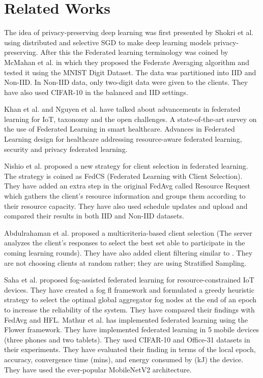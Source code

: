 \documentclass[conference]{IEEEtran}
\begin{document}
\section{Related Works}
The idea of privacy-preserving deep learning was first presented by Shokri et al. \cite{shokri2015privacy} using distributed and selective SGD to make deep learning models privacy-preserving. After this the Federated learning terminology was coined by McMahan et al. \cite{mcmahan2017communication} in which they proposed the Federate Averaging algorithm and tested it using the MNIST Digit Dataset. The data was partitioned into IID and Non-IID. In Non-IID data, only two-digit data were given to the clients. They have also used CIFAR-10 in the balanced and IID settings. 
 \par
Khan et al. \cite{khan2021federated} and Nguyen et al. \cite{nguyen2021federated} have talked about advancements in federated learning for IoT, taxonomy and the open challenges. A state-of-the-art survey on the use of Federated Learning in smart healthcare. Advances in Federated Learning design for healthcare addressing resource-aware federated learning, security and privacy federated learning. \par
Nishio et al. \cite{nishio2019client} proposed a new strategy for client selection in federated learning. The strategy is coined as FedCS (Federated Learning with Client Selection). They have added an extra step in the original FedAvg called Resource Request which gathers the client's resource information and groups them according to their resource capacity. They have also used schedule updates and upload and compared their results in both IID and Non-IID datasets.
\par
Abdulrahaman et al. \cite{abdulrahman2020fedmccs} proposed a multicriteria-based client selection (The server analyzes the client's responses to select the best set able to participate in the coming learning rounds). They have also added client filtering similar to \cite{nishio2019client}. They are not choosing clients at random rather; they are using Stratified Sampling.
\par
Saha et al. \cite{saha2020fogfl} proposed fog-assisted federated learning for resource-constrained IoT devices. They have created a fog fl framework and formulated a greedy heuristic strategy to select the optimal global aggregator fog nodes at the end of an epoch to increase the reliability of the system. They have compared their findings with FedAvg and HFL. Mathur et al. \cite{mathur2021device} has implemented federated learning using the Flower framework. They have implemented federated learning in 5 mobile devices (three phones and two tablets). They used CIFAR-10 and Office-31 datasets in their experiments. They have evaluated their finding in terms of the local epoch, accuracy, convergence time (mins), and energy consumed by (kJ) the device. They have used the ever-popular MobileNetV2 \cite{sandler2018mobilenetv2} architecture. 
\end{document}
